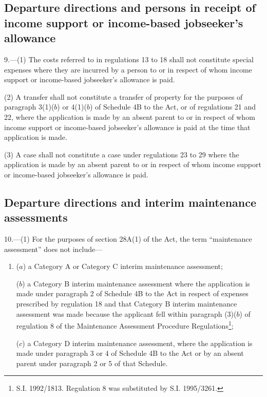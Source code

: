 \documentclass[a4paper]{article}
\begin{document}
\subsection[9. Departure directions and persons in receipt of income support or income-based
jobseeker’s allowance]{Departure directions and persons in receipt of income support or income-based
jobseeker’s allowance}

9.—(1) The costs referred to in regulations 13 to 18 shall
not constitute special expenses where they are incurred by a person to or in
respect of whom income support or income-based jobseeker’s allowance is paid.

(2) A transfer shall not constitute a transfer of property for the purposes of
paragraph 3(1)($b$) or 4(1)($b$) of Schedule 4B to the Act, or of regulations 21 and
22, where the application is made by an absent parent to or in respect of whom
income support or income-based jobseeker’s allowance is paid at the time that
application is made.

(3) A case shall not constitute a case under regulations 23 to 29 where the
application is made by an absent parent to or in respect of whom income support
or income-based jobseeker’s allowance is paid.

\subsection[10. Departure directions and interim maintenance assessments]{Departure directions and interim maintenance assessments}

10.—(1) For the purposes
of section 28A(1) of the Act, the term “maintenance assessment” does not
include—
\begin{enumerate}\item[]
($a$) a Category A or Category C interim maintenance assessment;

($b$) a Category B interim maintenance assessment where the application is made
under paragraph 2 of Schedule 4B to the Act in respect of expenses prescribed by
regulation 18 and that Category B interim maintenance assessment was made
because the applicant fell within paragraph (3)($b$) of regulation 8 of the
Maintenance Assessment Procedure Regulations\footnote{\frenchspacing S.I. 1992/1813. Regulation 8 was substituted by S.I. 1995/3261.};

($c$) a Category D interim maintenance assessment, where the application is made
under paragraph 3 or 4 of Schedule 4B to the Act or by an absent parent under
paragraph 2 or 5 of that Schedule.
\end{enumerate}
\end{document}
